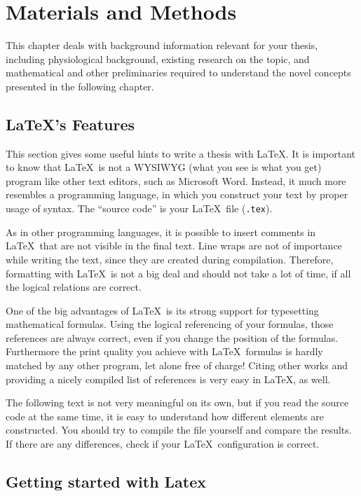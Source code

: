 \chapter{Materials and Methods}
\label{chap:materials-and-methods}

This chapter deals with background information relevant for your thesis, including physiological background, existing research on the topic, and mathematical and other preliminaries required to understand the novel concepts presented in the following chapter.

\section{\LaTeX's Features}

This section gives some useful hints to write a thesis with \LaTeX. 
It is important to know that \LaTeX\ is not a WYSIWYG (what you see is what you get) program like other text editors, such as Microsoft Word.
Instead, it much more resembles a programming language, in which you construct your text by proper usage of syntax.
The ``source code'' is your \LaTeX\ file (\texttt{.tex}). 

As in other programming languages, it is possible to insert comments in \LaTeX\ that are not visible in the final text. 
Line wraps are not of importance while writing the text, since they are created during compilation.
Therefore, formatting with \LaTeX\ is not a big deal and should not take a lot of time, if all the logical relations are correct.

One of the big advantages of \LaTeX\ is its strong support for typesetting mathematical formulas. 
Using the logical referencing of your formulas, those references are always correct, even if you change the position of the formulas. 
Furthermore the print quality you achieve with \LaTeX\ formulas is hardly matched by any other program, let alone free of charge!
Citing other works and providing a nicely compiled list of references is very easy in \LaTeX, as well.

The following text is not very meaningful on its own, but if you read the source code at the same time, it is easy to understand how different elements are constructed. 
You should try to compile the file yourself and compare the results. 
If there are any differences, check if your \LaTeX\ configuration is correct.

\section{Getting started with Latex}
\label{sec:getting-started-with}

